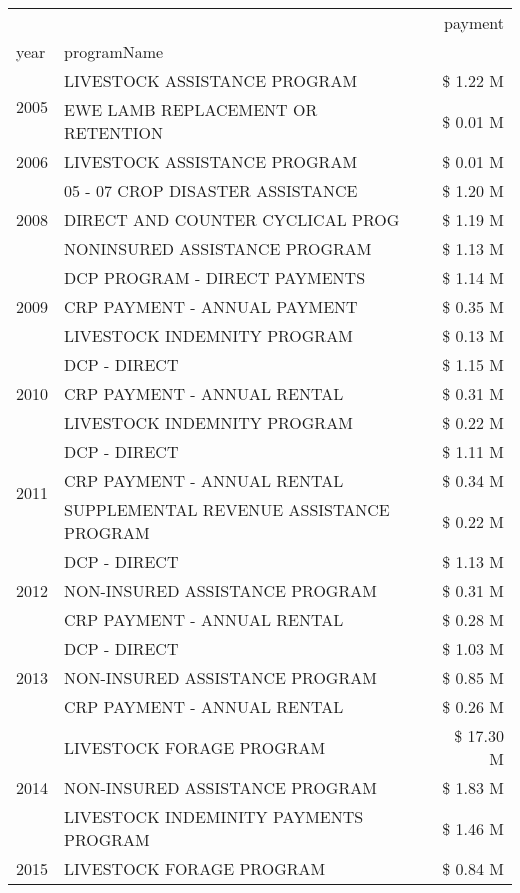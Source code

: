 \begin{tabular}{llr}
\toprule
 &  & payment \\
year & programName &  \\
\midrule
\multirow[t]{2}{*}{2005} & LIVESTOCK ASSISTANCE PROGRAM & \$ 1.22 M \\
 & EWE LAMB REPLACEMENT OR RETENTION & \$ 0.01 M \\
\cline{1-3}
2006 & LIVESTOCK ASSISTANCE PROGRAM & \$ 0.01 M \\
\cline{1-3}
\multirow[t]{3}{*}{2008} & 05 - 07 CROP DISASTER ASSISTANCE & \$ 1.20 M \\
 & DIRECT AND COUNTER CYCLICAL PROG & \$ 1.19 M \\
 & NONINSURED ASSISTANCE PROGRAM & \$ 1.13 M \\
\cline{1-3}
\multirow[t]{3}{*}{2009} & DCP PROGRAM - DIRECT PAYMENTS & \$ 1.14 M \\
 & CRP PAYMENT - ANNUAL PAYMENT & \$ 0.35 M \\
 & LIVESTOCK INDEMNITY PROGRAM & \$ 0.13 M \\
\cline{1-3}
\multirow[t]{3}{*}{2010} & DCP - DIRECT & \$ 1.15 M \\
 & CRP PAYMENT - ANNUAL RENTAL & \$ 0.31 M \\
 & LIVESTOCK INDEMNITY PROGRAM & \$ 0.22 M \\
\cline{1-3}
\multirow[t]{3}{*}{2011} & DCP - DIRECT & \$ 1.11 M \\
 & CRP PAYMENT - ANNUAL RENTAL & \$ 0.34 M \\
 & SUPPLEMENTAL REVENUE ASSISTANCE PROGRAM & \$ 0.22 M \\
\cline{1-3}
\multirow[t]{3}{*}{2012} & DCP - DIRECT & \$ 1.13 M \\
 & NON-INSURED ASSISTANCE PROGRAM & \$ 0.31 M \\
 & CRP PAYMENT - ANNUAL RENTAL & \$ 0.28 M \\
\cline{1-3}
\multirow[t]{3}{*}{2013} & DCP - DIRECT & \$ 1.03 M \\
 & NON-INSURED ASSISTANCE PROGRAM & \$ 0.85 M \\
 & CRP PAYMENT - ANNUAL RENTAL & \$ 0.26 M \\
\cline{1-3}
\multirow[t]{3}{*}{2014} & LIVESTOCK FORAGE PROGRAM & \$ 17.30 M \\
 & NON-INSURED ASSISTANCE PROGRAM & \$ 1.83 M \\
 & LIVESTOCK INDEMINITY PAYMENTS PROGRAM & \$ 1.46 M \\
\cline{1-3}
\multirow[t]{3}{*}{2015} & LIVESTOCK FORAGE PROGRAM & \$ 0.84 M \\

\end{tabular}
